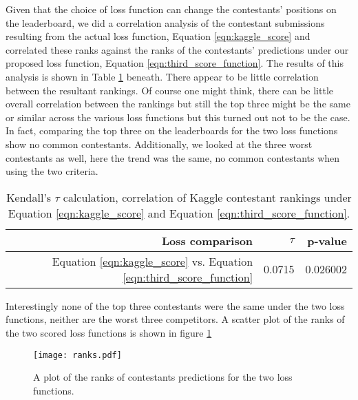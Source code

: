 %

Given that the choice of loss function can change the contestants' positions on the leaderboard, we did a correlation analysis of the contestant submissions resulting from the actual loss function, Equation \ref{eqn:kaggle_score} and correlated these ranks against the ranks of the contestants'  predictions under our proposed loss function, Equation \ref{eqn:third_score_function}. The results of this analysis is shown in Table \ref{tab:kendall_tau_table} beneath. There appear to be little correlation between the resultant rankings. Of course one might think, there can be little overall correlation between the rankings but still the top three might be the same or similar across the various loss functions but this turned out not to be the case. In fact, comparing the top three on the leaderboards for the two loss functions show no common contestants. Additionally, we looked at the three worst contestants as well, here the trend was the same, no common contestants when using the two criteria. 

\begin{table}[ht]
\centering
\begin{tabular}{rrr}
  \hline
Loss comparison & $\tau$ & p-value \\ 
  \hline
Equation \ref{eqn:kaggle_score} vs. Equation \ref{eqn:third_score_function} &0.0715 & 0.026002 \\ 
   \hline
\end{tabular}
\label{tab:kendall_tau_table}
\caption{Kendall's $\tau$ calculation, correlation of Kaggle contestant rankings under Equation  \ref{eqn:kaggle_score} and Equation \ref{eqn:third_score_function}.}
\end{table}

Interestingly none of the top three contestants were the same under the two loss functions, neither are the worst three competitors. A scatter plot of the ranks of the two scored loss functions is shown in figure \ref{fig:ranks}

\begin{figure}[H]
\centering
\texttt{[image: ranks.pdf]}
\caption{A plot of the ranks of contestants predictions for the two loss functions.}\label{fig:ranks}
\end{figure}



